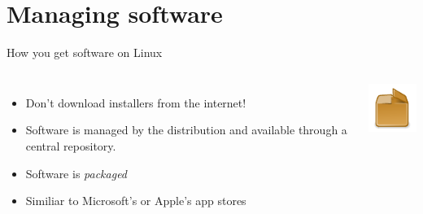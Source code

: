     \section{Managing software}

    \begin{frame}[t,fragile]{How you get software on Linux}
        \begin{columns}[T]
            \begin{itemize}
                \item Don't download installers from the internet!
                \item Software is managed by the distribution and available
                    through a central repository.
                \item Software is \emph{packaged}
                \item Similiar to Microsoft's or Apple's app stores
            \end{itemize}
            \vspace{-1cm}
            \begin{center}
                \includegraphics[width=0.7\columnwidth]{img/package-icon.pdf}
            \end{center}
        \end{columns}
    \end{frame}

